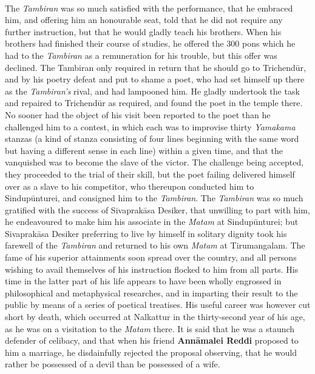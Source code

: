 \documentclass{article}
\begin{document}
\paragraph{}
The \emph{Tambiran} was so much satisfied with the performance, that he embraced him, and offering him an honourable seat, told that he did not require any further instruction, but that he would gladly teach his brothers. When his brothers had finished their course of studies, he offered the 300 pons which he had to the \emph{Tambiran} as a remuneration for his trouble, but this offer was declined. The Tambiran only required in return that he should go to Trichend\={u}r, and by his poetry defeat and put to shame a poet, who had set himself up there as the \emph{Tambiran's} rival, and had lampooned him. He gladly undertook the task and repaired to Trichend\={u}r as required, and found the poet in the temple there. No sooner had the object of his visit been reported to the poet than he challenged him to a contest, in which each was to improvise thirty \emph{Yamakama} stanzas (a kind of stanza consisting of four lines beginning with the same word but having a different sense in each line) within a given time, and that the vanquished was to become the slave of the victor. The challenge being accepted, they proceeded to the trial of their skill, but the poet failing delivered himself over as a slave to his competitor, who thereupon conducted him to Sindup\={u}nturei, and consigned him to the \emph{Tambiran}. The \emph{Tambiran} was so much gratified with the success of Sivaprak\={a}sa Desiker, that unwilling to part with him, he endeavoured to make him his associate in the \emph{Matam} at Sindup\={u}nturei; but Sivaprak\={a}sa Desiker preferring to live by himself in solitary dignity took his farewell of the \emph{Tambiran} and returned to his own \emph{Matam} at Tirumangalam. The fame of his superior attainments soon spread over the country, and all persons wishing to avail themselves of his instruction flocked to him from all parts. His time in the latter part of his life appears to have been wholly engrossed in philosophical and metaphysical researches, and in imparting their result to the public by means of a series of poetical treatises. His useful career was however cut short by death, which occurred at Nalkattur in the thirty-second year of his age, as he was on a visitation to the \emph{Matam} there. It is said that he was a staunch defender of celibacy, and that when his friend \textbf{Ann\={a}malei Reddi} proposed to him a marriage, he disdainfully rejected the proposal observing, that he would rather be possessed of a devil than be possessed of a wife.
\end{document}
